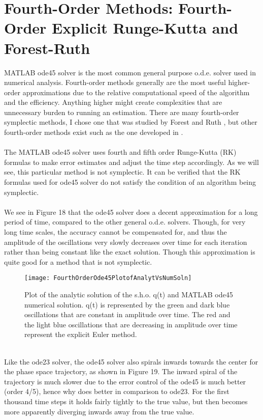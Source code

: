 \documentclass[12pt]{article}
\begin{document}
\section{Fourth-Order Methods: Fourth-Order Explicit Runge-Kutta and Forest-Ruth}
MATLAB ode45 solver is the most common general purpose o.d.e. solver used in numerical analysis. Fourth-order methods generally are the most useful higher-order approximations due to the relative computational speed of the algorithm and the efficiency. Anything higher might create complexities that are unnecessary burden to running an estimation. There are many fourth-order symplectic methods, I chose one that was studied by Forest and Ruth \cite{ER}, but other fourth-order methods exist such as the one developed in \cite{CR}.\\\\
\indent The MATLAB ode45 solver uses fourth and fifth order Runge-Kutta (RK) formulas to make error estimates and adjust the time step accordingly. As we will see, this particular method is not symplectic. It can be verified that the RK formulas used for ode45 solver do not satisfy the condition of an algorithm being symplectic. \\\\
\indent We see in Figure 18 that the ode45 solver does a decent approximation for a long period of time, compared to the other general o.d.e. solvers. Though, for very long time scales, the accuracy cannot be compensated for, and thus the amplitude of the oscillations very slowly decreases over time for each iteration rather than being constant like the exact solution. Though this approximation is quite good for a method that is not symplectic.\\
\begin{figure}[h!]
\centering
\texttt{[image: FourthOrderOde45PlotofAnalytVsNumSoln]}
\caption{Plot of the analytic solution of the s.h.o. q(t) and MATLAB ode45 numerical solution. q(t) is represented by the green and dark blue oscillations that are constant in amplitude over time. The red and the light blue oscillations that are decreasing in amplitude over time represent the explicit Euler method.}
\end{figure}
\\\indent Like the ode23 solver, the ode45 solver also spirals inwards towards the center for the phase space trajectory, as shown in Figure 19. The inward spiral of the trajectory is much slower due to the error control of the ode45 is much better (order 4/5), hence why does better in comparison to ode23. For the first thousand time steps it holds fairly tightly to the true value, but then becomes more apparently diverging inwards away from the true value. \\
\end{document}

